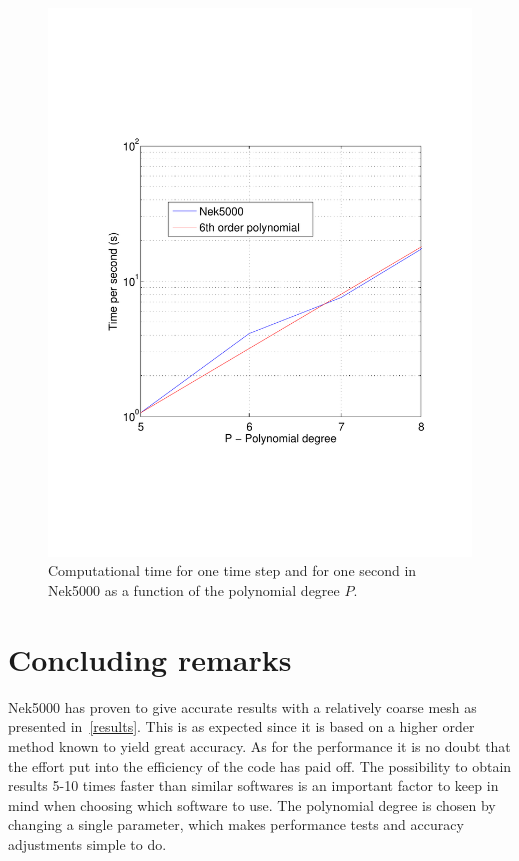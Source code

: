 \begin{figure}[h]
{\begin{minipage}{.6\textwidth}
  \includegraphics[trim=0.5cm 5cm 0.5cm 5cm,width=1.0\linewidth]{Figures/tpers.pdf}
\end{minipage}%
}
  \caption{Computational time for one time step and for one second in Nek5000 as a function of the polynomial degree $P$. }
  \label{fig:comptime}
\end{figure}
%
\chapter{Concluding remarks} \label{discussion}
Nek5000 has proven to give accurate results with a relatively coarse mesh as
presented in~\cref{results}. This is as expected since it is based on a higher order 
method known to yield great accuracy. As for the performance it is no doubt that the 
effort put into the efficiency of the code has paid off. The possibility to obtain 
results 5-10 times faster than similar softwares is an important factor to keep in mind 
when choosing which software to use. 
The polynomial degree is chosen by changing a single parameter, which makes performance tests
and accuracy adjustments simple to do. 

